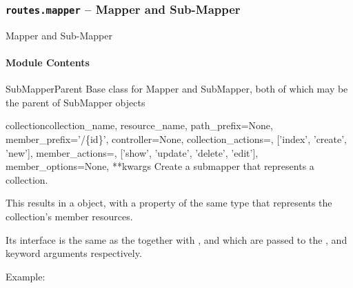 \documentclass[letterpaper,10pt,english]{manual}
\begin{document}
\resetcurrentobjects
\hypertarget{--doc-modules/mapper}{}

\subsubsection{\texttt{routes.mapper} -- Mapper and Sub-Mapper}
\hypertarget{module-routes.mapper}{}
\modulesynopsis{}
Mapper and Sub-Mapper


\paragraph{Module Contents}

\hypertarget{routes.mapper.SubMapperParent}{}\begin{classdesc}{SubMapperParent}{}
Base class for Mapper and SubMapper, both of which may be the parent
of SubMapper objects

\hypertarget{routes.mapper.SubMapperParent.collection}{}\begin{methoddesc}{collection}{collection\_name, resource\_name, path\_prefix=None, member\_prefix='/\{id\}', controller=None, collection\_actions=, {[}'index', 'create', 'new'{]}, member\_actions=, {[}'show', 'update', 'delete', 'edit'{]}, member\_options=None, **kwargs}
Create a submapper that represents a collection.

This results in a \hyperlink{routes.mapper.SubMapper}{} object, with a
 property of the same type that represents the collection's
member resources.

Its interface is the same as the  together with
,  and 
which are passed to the ,
 and keyword arguments respectively.

Example:


\end{methoddesc}
\end{classdesc}
\end{document}
